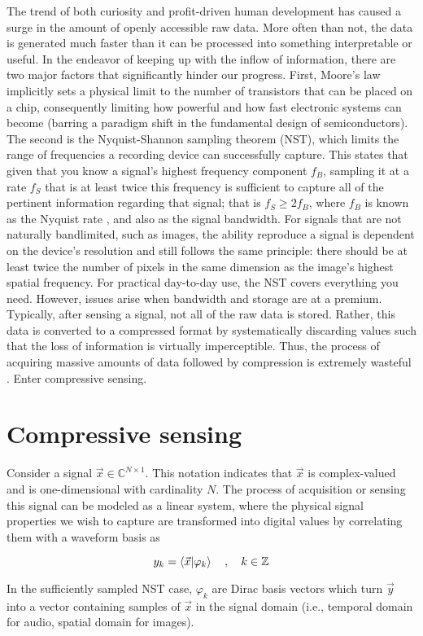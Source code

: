 The trend of both curiosity and profit-driven human development has caused a
surge in the amount of openly accessible raw data. More often than not, the data is generated much faster than it can be processed into something interpretable or useful. In the endeavor of keeping up with the inflow of information, there are two major factors that significantly hinder our progress. First, Moore’s law implicitly sets a physical limit to the number of transistors that can be placed on a chip, consequently limiting how powerful and how fast electronic systems can become (barring a paradigm shift in the fundamental design of semiconductors). The second is the Nyquist-Shannon sampling theorem (NST), which limits the range of frequencies a recording device can successfully capture. This states that given that you know a signal's highest frequency component $f_B$, sampling it at a rate $f_S$ that is at least twice this frequency is sufficient to capture all of the pertinent information regarding that signal; that is $f_S \geq 2f_B$, where $f_B$ is known as the Nyquist rate \cite{Shannon1949}, and also as the signal bandwidth. For signals that are not naturally bandlimited, such as images, the ability reproduce a signal is dependent on the device's resolution and still follows the same principle: there should be at least twice the number of pixels in the same dimension as the image's highest spatial frequency. For practical day-to-day use, the NST covers everything you need. However, issues arise when bandwidth and storage are at a premium. Typically, after sensing a signal, not all of the raw data is stored. Rather, this data is converted to a compressed format by systematically discarding values such that the loss of information is virtually imperceptible. Thus, the process of acquiring massive amounts of data followed by compression is extremely wasteful \cite{Candes2008b}. Enter compressive sensing.

\section{Compressive sensing}
\label{sec:cs}

Consider a signal $\vec{x} \in \mathbb{C}^{N \times 1}$. This notation indicates that $\vec{x}$ is complex-valued and is one-dimensional with cardinality $N$. The process of acquisition or sensing this signal can be modeled as a linear system, where the physical signal properties we wish to capture are transformed into digital values by correlating them with a waveform basis as

\begin{equation}\label{eq:cesa}
    y_k = \innerproduct{\vec{x}}{\varphi_k} \quad , \quad k \in \mathbb{Z}
\end{equation}

\noindent In the sufficiently sampled NST case, $\varphi_k$ are Dirac basis vectors which turn $\vec{y}$ into a vector containing samples of $\vec{x}$ in the signal domain (i.e., temporal domain for audio, spatial domain for images).